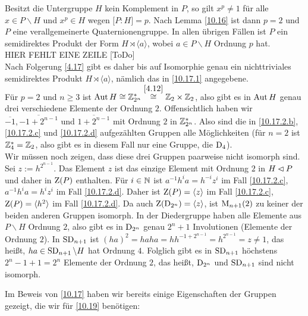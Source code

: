 \begin{beweis}
 Besitzt die Untergruppe $H$ kein Komplement in $P$, so gilt $x^p\neq 1$ f\"ur alle $x\in P\backslash H$ und $x^p\in H$ wegen $\lbrack P:H\rbrack=p$. Nach Lemma \ref{10.16} ist dann $p=2$ und $P$ eine verallgemeinerte Quaternionengruppe. In allen \"ubrigen F\"allen ist $P$ ein semidirektes Produkt der Form $H\rtimes \langle a\rangle$, wobei $a\in P\backslash H$ Ordnung $p$ hat.\\
HIER FEHLT EINE ZEILE [ToDo]
\\
Nach Folgerung \ref{4.17} gibt es daher bis auf Isomorphie genau ein nichttriviales semidirektes Produkt $H\rtimes \langle a\rangle$, n\"amlich das in \ref{10.17.1} angegebene.\\
F\"ur $p=2$ und $n\geq 3$ ist $\operatorname{Aut} H\cong\mathbb{Z}_{2^n}^*\stackrel{\ref{4.12}}{\cong}\mathbb{Z}_2\times\mathbb{Z}_2$, also gibt es in $\operatorname{Aut} H$ genau drei verschiedene Elemente der Ordnung $2$. Offensichtlich haben wir $\overline{-1},\overline{-1+2^{n-1}}$ und $\overline{1+2^{n-1}}$ mit Ordnung $2$ in $\mathbb{Z}_{2^n}^*$. Also sind die in \ref{10.17.2.b}, \ref{10.17.2.c} und \ref{10.17.2.d} aufgez\"ahlten Gruppen alle M\"oglichkeiten (f\"ur $n=2$ ist $\mathbb{Z}_4^*=\mathbb{Z}_2$, also gibt es in diesem Fall nur eine Gruppe, die $\operatorname{D}_4$).\\
Wir m\"ussen noch zeigen, dass diese drei Gruppen paarweise nicht isomorph sind. Sei $z:=h^{2^{n-1}}$. Das Element $z$ ist das einzige Element mit Ordnung $2$ in $H\lhd P$ und daher in $\operatorname{Z}(P)$ enthalten. F\"ur $i\in \mathbb{N}$ ist $a^{-1}h^ia=h^{-i}z^i$ im Fall \ref{10.17.2.c}, $a^{-1}h^ia=h^{i}z^i$ im Fall \ref{10.17.2.d}. Daher ist $\operatorname{Z}(P)=\langle z\rangle$ im Fall \ref{10.17.2.c}, $\operatorname{Z}(P)=\langle h^2\rangle$ im Fall \ref{10.17.2.d}. Da auch $\operatorname{Z}(\operatorname{D}_{2^n})=\langle z\rangle$, ist $\operatorname{M}_{n+1}(2)$ zu keiner der beiden anderen Gruppen isomorph. In der Diedergruppe haben alle Elemente aus $P\backslash H$ Ordnung $2$, also gibt es in $\operatorname{D}_{2^n}$ genau $2^n+1$ Involutionen (Elemente der Ordnung $2$). In $\operatorname{SD}_{n+1}$ ist $(ha)^2=haha=hh^{-1+2^{n-1}}=h^{2^{n-1}}=z\neq 1$, das hei\ss{}t, $ha\in \operatorname{SD}_{n+1}\backslash H$ hat Ordnung $4$. Folglich gibt es in $\operatorname{SD}_{n+1}$ h\"ochstens $2^n-1+1=2^n$ Elemente der Ordnung $2$, das hei\ss{}t, $\operatorname{D}_{2^n}$ und $\operatorname{SD}_{n+1}$ sind nicht isomorph.
\end{beweis}


Im Beweis von \ref{10.17} haben wir bereits einige Eigenschaften der Gruppen gezeigt, die wir f\"ur \ref{10.19} ben\"otigen:

